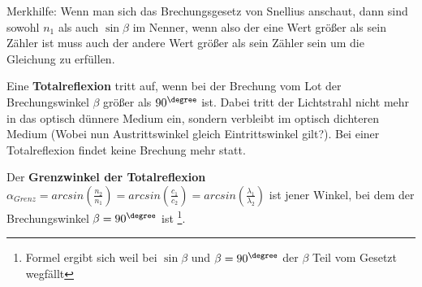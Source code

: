 \documentclass[../document.tex]{subfiles}
\begin{document}
Merkhilfe: Wenn man sich das Brechungsgesetz von Snellius anschaut, dann sind sowohl $n_1$ als auch $\sin \beta$ im Nenner, wenn also der eine Wert größer als sein Zähler ist muss auch der andere Wert größer als sein Zähler sein um die Gleichung zu erfüllen.

Eine \textbf{Totalreflexion} tritt auf, wenn bei der Brechung vom Lot der Brechungswinkel $\beta$ größer als $90^\degree$ ist. Dabei tritt der Lichtstrahl nicht mehr in das optisch dünnere Medium ein, sondern verbleibt im optisch dichteren Medium (Wobei nun Austrittswinkel gleich Eintrittswinkel gilt?). Bei einer Totalreflexion findet keine Brechung mehr statt.

Der \textbf{Grenzwinkel der Totalreflexion } $\alpha_{Grenz} = arcsin(\frac{n_2}{n_1}) = arcsin(\frac{c_1}{c_2}) = arcsin(\frac{\lambda_1}{\lambda_2})$ ist jener Winkel, bei dem der Brechungswinkel $\beta = 90^\degree$ ist \footnote{Formel ergibt sich weil bei $\sin\beta$ und $\beta = 90^\degree$ der $\beta$ Teil vom Gesetzt wegfällt}. 
\end{document}

